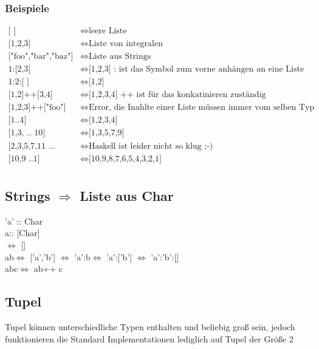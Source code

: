 \subsubsection{Beispiele}
\begin{align*}
\text{[ ]} &\Leftrightarrow \text{leere Liste}\\
\text{[1,2,3]} &\Leftrightarrow \text{Liste von integralen}\\
\text{["foo","bar","baz"]} &\Leftrightarrow \text{Liste aus Strings}\\
\text{1:[2,3]} &\Leftrightarrow \text{[1,2,3] : ist das Symbol zum vorne anhängen an eine Liste}\\
\text{1:2:[ ]} &\Leftrightarrow \text{[1,2]}\\
\text{[1,2]++[3,4]} &\Leftrightarrow \text{[1,2,3,4] ++ ist für das konkatinieren zuständig}\\
\text{[1,2,3]++["foo"]} &\Leftrightarrow \text{Error, die Inahlte einer Liste müssen immer vom selben Typ sein.}\\
\text{[1..4]} &\Leftrightarrow \text{[1,2,3,4]}\\
\text{[1,3, .. 10]} &\Leftrightarrow \text{[1,3,5,7,9]}\\
\text{[2,3,5,7,11 ... 100]} &\Leftrightarrow \text{Haskell ist leider nicht so klug ;-) }\\
\text{[10,9 ..1]} &\Leftrightarrow \text{[10,9,8,7,6,5,4,3,2,1]}\\
\end{align*}

\subsection{Strings $\Rightarrow$ Liste aus Char}
'a' :: Char\\
\grqq  a\grqq   :: [Char]\\
\grqq  \grqq   $\Leftrightarrow$ []\\
\grqq  ab\grqq   $\Leftrightarrow$  ['a','b'] $\Leftrightarrow$  'a':\grqq  b\grqq   $\Leftrightarrow$ 'a':['b'] $\Leftrightarrow$  'a':'b':[]\\
\grqq  abc\grqq   $\Leftrightarrow$  \grqq  ab\grqq   ++ \grqq  c\grqq  

\subsection{Tupel}
Tupel können unterschiedliche Typen enthalten und beliebig groß sein, jedoch funktionieren die Standard Implementationen lediglich auf Tupel der Größe 2\\
